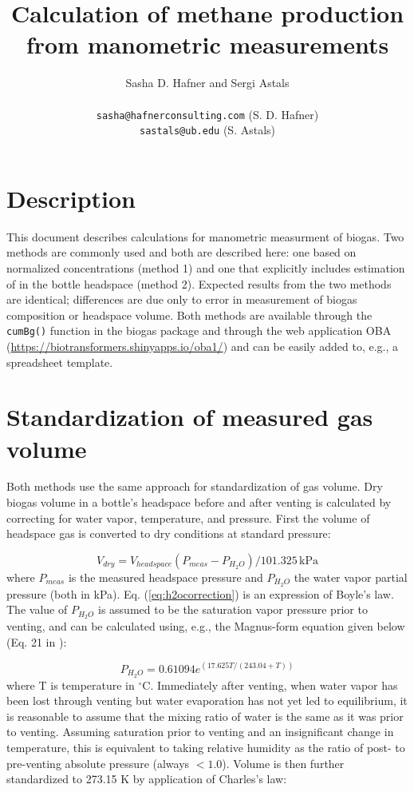 \documentclass[]{article}
\title {Calculation of methane production from manometric measurements}
\author{Sasha D. Hafner and Sergi Astals\\
\\
\texttt{sasha@hafnerconsulting.com} (S. D. Hafner)\\
\texttt{sastals@ub.edu} (S. Astals)
}
\newcommand{\unit}[1]{\ensuremath{\, \mathrm{#1}}}
\begin{document}
\maketitle

\section*{Description}
This document describes calculations for manometric measurment of biogas.
Two methods are commonly used and both are described here: one based on normalized  concentrations (method 1) and one that explicitly includes estimation of  in the bottle headspace (method 2).
Expected results from the two methods are identical; differences are due only to error in measurement of biogas composition or headspace volume.
Both methods are available through the \texttt{cumBg()} function in the biogas package \cite{softwarex} and through the web application OBA (\url{https://biotransformers.shinyapps.io/oba1/}) and can be easily added to, e.g., a spreadsheet template.

\section{Standardization of measured gas volume}
Both methods use the same approach for standardization of gas volume.
Dry biogas volume in a bottle's headspace before and after venting is calculated by correcting for water vapor, temperature, and pressure.
First the volume of headspace gas is converted to dry conditions at standard pressure:

\begin{equation}
  \label{eq:h2ocorrection}
  V_{dry} = V_{headspace}(P_{meas} - P_{H_2O})/101.325 \unit{kPa}
\end{equation}
where $P_{meas}$ is the measured headspace pressure and $P_{H_2O}$ the water vapor partial pressure (both in kPa).
Eq. (\ref{eq:h2ocorrection}) is an expression of Boyle's law.
The value of $P_{H_2O}$ is assumed to be the saturation vapor pressure prior to venting, and can be calculated using, e.g., the Magnus-form equation given below (Eq. 21 in \cite{magnus}):

\begin{equation}
\label{eq:magnus}
   P_{H_2O} = 0.61094 e^{(17.625 T/(243.04 + T))}
\end{equation}
where T is temperature in $^\circ$C.
Immediately after venting, when water vapor has been lost through venting but water evaporation has not yet led to equilibrium, it is reasonable to assume that the mixing ratio of water is the same as it was prior to venting.
Assuming saturation prior to venting and an insignificant change in temperature, this is equivalent to taking relative humidity as the ratio of post- to pre-venting absolute pressure (always $<1.0$). 
Volume is then further standardized to 273.15 K by application of Charles's law:
\end{document}
